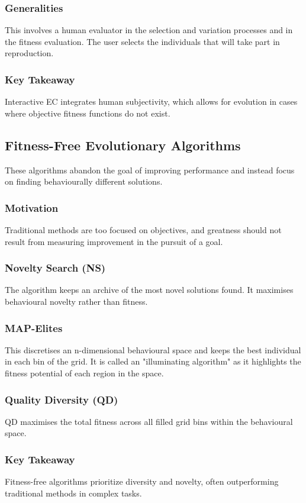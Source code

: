 \subsubsection*{Generalities}
This involves a human evaluator in the selection and variation processes and in the fitness evaluation. The user selects the individuals that will take part in reproduction.
\subsubsection*{Key Takeaway}
Interactive EC integrates human subjectivity, which allows for evolution in cases where objective fitness functions do not exist.

\subsection*{Fitness-Free Evolutionary Algorithms}
These algorithms abandon the goal of improving performance and instead focus on finding behaviourally different solutions.
\subsubsection*{Motivation}
Traditional methods are too focused on objectives, and greatness should not result from measuring improvement in the pursuit of a goal.
\subsubsection*{Novelty Search (NS)}
The algorithm keeps an archive of the most novel solutions found. It maximises behavioural novelty rather than fitness.
\subsubsection*{MAP-Elites}
This discretises an n-dimensional behavioural space and keeps the best individual in each bin of the grid. It is called an "illuminating algorithm" as it highlights the fitness potential of each region in the space.
\subsubsection*{Quality Diversity (QD)}
QD maximises the total fitness across all filled grid bins within the behavioural space.
\subsubsection*{Key Takeaway}
Fitness-free algorithms prioritize diversity and novelty, often outperforming traditional methods in complex tasks.


